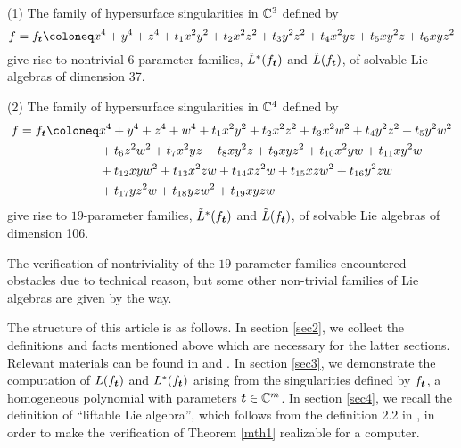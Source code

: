 \begin{theorem}\label{mth1} \hfill
  \item[(1)] The family of hypersurface singularities in ${\mathbb{C}}^3$ defined by  
    \[f=f_\bt\coloneq x^4+y^4+z^4
      +t_1x^2y^2+t_2x^2z^2+t_3y^2z^2
    +t_4x^2yz+t_5xy^2z+t_6xyz^2\]
    give rise to nontrivial $6$-parameter families, $\tilde L^*(f_{\boldsymbol t})$ and $\tilde L(f_{\boldsymbol t})$, of solvable Lie algebras of dimension 37.

  \item[(2)] The family of hypersurface singularities in ${\mathbb{C}}^4$ defined by  
    \begin{align*}
      f=f_\bt\coloneq
        & x^4+y^4+z^4+w^4
        +t_1x^2y^2+t_2x^2z^2+t_3x^2w^2+t_4y^2z^2+t_5y^2w^2 \\
        &+t_6z^2w^2+t_7x^2yz+t_8xy^2z+t_9xyz^2
        +t_{10}x^2yw+t_{11}xy^2w \\
        &+t_{12}xyw^2+t_{13}x^2zw+t_{14}xz^2w+t_{15}xzw^2
        +t_{16}y^2zw\\
        &+t_{17}yz^2w+t_{18}yzw^2+t_{19}xyzw
    \end{align*}
    give rise to $19$-parameter families, $\tilde L^*(f_{\boldsymbol t})$ and $\tilde L(f_{\boldsymbol t})$, of solvable Lie algebras of dimension 106.
\end{theorem}

The verification of nontriviality of the $19$-parameter families encountered obstacles due to technical reason, but some other non-trivial families of Lie algebras are given by the way. 

The structure of this article is as follows. In section \ref{sec2}, we collect the definitions and facts mentioned above which are necessary for the latter sections. Relevant materials can be found in \cite{BN} and \cite{GL}. In section \ref{sec3}, we demonstrate the computation of  $L(f_{\boldsymbol t})$ and $L^*(f_{\boldsymbol t})$ arising from the singularities defined by $f_{\boldsymbol t}$, a homogeneous polynomial with parameters ${\boldsymbol t}\in {\mathbb{C}}^m$. In section \ref{sec4}, we recall the definition of ``liftable Lie algebra'', which follows from the definition 2.2 in \cite{SY}, in order to make the verification of Theorem \ref{mth1}  realizable for a computer.
